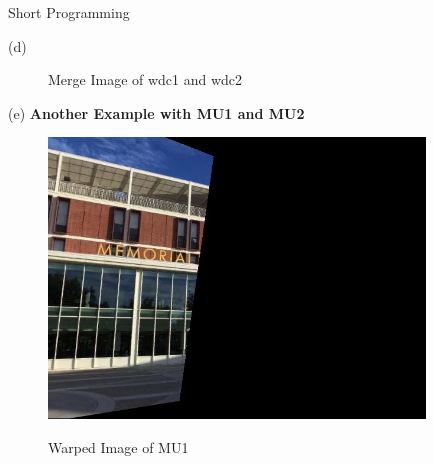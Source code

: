 \documentclass[a4paper,12pt]{article}
\begin{document}
\begin{section}{Short Programming}
\begin{subsection}{(d)}
\begin{figure}[!htb]
        \caption{Merge Image of wdc1 and wdc2}
      \end{figure}
      

\end{subsection}

\clearpage
\begin{subsection}{(e)}
\textbf{Another Example with MU1 and MU2}\\

 \begin{figure}[!htb]
       \center
       {\includegraphics[width=10cm]
       {MU_warp.png}}
        \caption{Warped Image of MU1}
      \end{figure}




\end{subsection}
\end{section}
\end{document}
